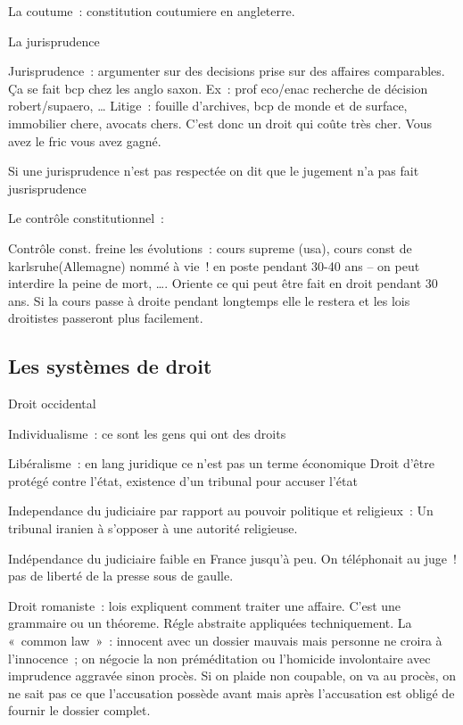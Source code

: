 \documentclass[a4paper,12pt]{article}
\begin{document}
La coutume : constitution coutumiere en angleterre.

La jurisprudence

Jurisprudence : argumenter sur des decisions prise sur des affaires comparables. Ça se fait bcp chez les anglo saxon. Ex : prof eco/enac recherche de décision robert/supaero, …
Litige : fouille d’archives, bcp de monde et de surface, immobilier chere, avocats chers.
C’est donc un droit qui coûte très cher. Vous avez le fric vous avez gagné.


Si une jurisprudence n’est pas respectée on dit que le jugement n’a pas fait jusrisprudence

Le contrôle constitutionnel :

Contrôle const. freine les évolutions : cours supreme (usa), cours const de karlsruhe(Allemagne) nommé à vie ! en poste pendant 30-40 ans – on peut interdire la peine de mort, …. Oriente ce qui peut être fait en droit pendant 30 ans.
Si la cours passe à droite pendant longtemps elle le restera et les lois droitistes passeront plus facilement.




\subsection{Les systèmes de droit}

Droit occidental

Individualisme : ce sont les gens qui ont des droits


Libéralisme : en lang juridique ce n’est pas un terme économique
Droit d’être protégé contre l’état, existence d’un tribunal pour accuser l’état


Independance du judiciaire par rapport au pouvoir politique et religieux :
Un tribunal iranien à s’opposer à une autorité religieuse.

Indépendance du judiciaire faible en France jusqu’à peu.
On téléphonait au juge !  pas de liberté de la presse sous de gaulle.


Droit romaniste : lois expliquent comment traiter une affaire.
C’est une grammaire ou un théoreme. Régle abstraite appliquées techniquement.
La « common law » : innocent avec un dossier mauvais mais personne ne croira à l’innocence ; on négocie la non préméditation ou l’homicide involontaire avec imprudence aggravée sinon procès. Si on plaide non coupable, on va au procès, on ne sait pas ce que l’accusation possède avant mais après l’accusation est obligé de fournir le dossier complet. 
\end{document}
